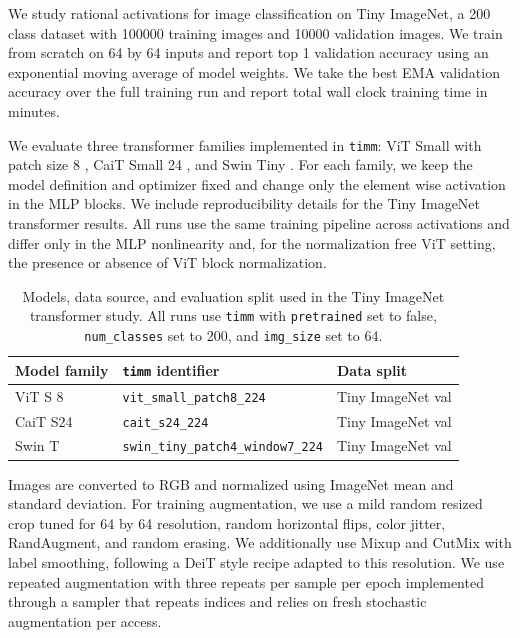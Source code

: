 \documentclass{article}
\theoremstyle{plain}
\theoremstyle{definition}
\theoremstyle{remark}
\begin{document}
We study rational activations for image classification on Tiny ImageNet, a 200 class dataset with 100000 training images and 10000 validation images. We train from scratch on 64 by 64 inputs and report top 1 validation accuracy using an exponential moving average of model weights. We take the best EMA validation accuracy over the full training run and report total wall clock training time in minutes.

We evaluate three transformer families implemented in \texttt{timm}: ViT Small with patch size 8 \cite{Dosovitskiy2020ViT}, CaiT Small 24 \cite{Touvron2021CaiT}, and Swin Tiny \cite{Liu2021Swin}. For each family, we keep the model definition and optimizer fixed and change only the element wise activation in the MLP blocks. We include reproducibility details for the Tiny ImageNet transformer results. All runs use the same training pipeline across activations and differ only in the MLP nonlinearity and, for the normalization free ViT setting, the presence or absence of ViT block normalization.

\begin{table}
\centering
\caption{Models, data source, and evaluation split used in the Tiny ImageNet transformer study. All runs use \texttt{timm} with \texttt{pretrained} set to false, \texttt{num\_classes} set to 200, and \texttt{img\_size} set to 64.}
\label{tab:tinyimg_setup}
\footnotesize
\begin{tabular}{@{}p{}p{}p{}@{}}
\toprule
Model family & \texttt{timm} identifier & Data split \\
\midrule
ViT S 8 & \texttt{vit\_small\_patch8\_224} & Tiny ImageNet val \\
CaiT S24 & \texttt{cait\_s24\_224} & Tiny ImageNet val \\
Swin T & \texttt{swin\_tiny\_patch4\_window7\_224} & Tiny ImageNet val \\
\bottomrule
\end{tabular}
\end{table}

Images are converted to RGB and normalized using ImageNet mean and standard deviation. For training augmentation, we use a mild random resized crop tuned for 64 by 64 resolution, random horizontal flips, color jitter, RandAugment, and random erasing. We additionally use Mixup and CutMix with label smoothing, following a DeiT style recipe adapted to this resolution. We use repeated augmentation with three repeats per sample per epoch implemented through a sampler that repeats indices and relies on fresh stochastic augmentation per access.
\end{document}
